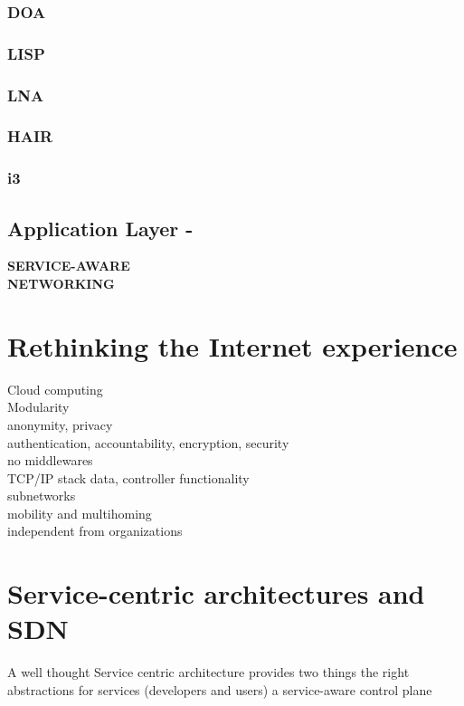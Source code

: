 \documentclass[12pt,a4paper,oneside]{article}
\begin{document}
\subsubsection{DOA}
\subsubsection{LISP}
\subsubsection{LNA}
\subsubsection{HAIR}
\subsubsection{i3}

\subsection{Application Layer - }


\newpage
\thispagestyle{empty}
{}
{\Huge \bf \noindent SERVICE-AWARE\\[0.2cm] NETWORKING}
\newpage

\section{Rethinking the Internet experience}
Cloud computing
\\Modularity
\\anonymity, privacy
\\authentication, accountability, encryption, security
\\no middlewares
\\TCP/IP stack data, controller functionality
\\subnetworks
\\mobility and multihoming
\\independent from organizations


\newpage
\section{Service-centric architectures and SDN}
A well thought Service centric architecture provides two things
the right abstractions for services (developers and users)
a service-aware control plane
\end{document}
